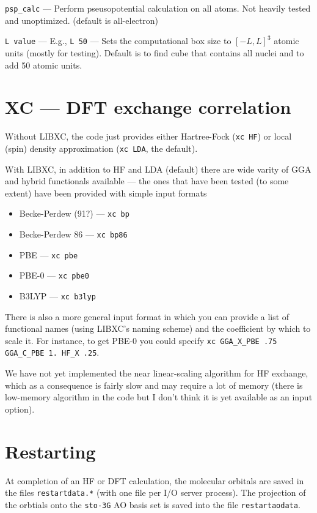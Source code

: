\documentclass[letterpaper]{book}
\begin{document}
{\tt psp\_calc} --- Perform pseusopotential calculation on all atoms.  Not heavily tested and unoptimized. (default is all-electron)

{\tt L value} --- E.g., {\tt L 50} --- Sets the computational box size to $[-L,L]^3$ atomic units (mostly for testing).  Default is to find cube that contains all nuclei and to add 50 atomic units.

\section{XC --- DFT exchange correlation}

Without LIBXC, the code just provides either Hartree-Fock ({\tt xc HF}) or local (spin) density approximation ({\tt xc LDA}, the default).

With LIBXC, in addition to HF and LDA (default) there are wide varity of GGA and hybrid functionals available --- the ones that have been tested (to some extent) have been provided with simple input formats
\begin{itemize}
\item Becke-Perdew (91?) --- \verb+xc bp+
\item Becke-Perdew 86 --- \verb+xc bp86+
\item PBE --- \verb+xc pbe+
\item PBE-0 --- \verb+xc pbe0+
\item B3LYP --- \verb+xc b3lyp+
\end{itemize}

There is also a more general input format in which you can provide a list of functional names (using LIBXC's naming scheme) and the coefficient by which to scale it.  For instance, to get PBE-0 you could specify
\verb+xc GGA_X_PBE .75 GGA_C_PBE 1. HF_X .25+.

We have not yet implemented the near linear-scaling algorithm for HF
exchange, which as a consequence is fairly slow and may require a lot
of memory (there is low-memory algorithm in the code but I don't think
it is yet available as an input option).

\section{Restarting}

At completion of an HF or DFT calculation, the molecular orbitals are
saved in the files \verb+restartdata.*+ (with one file per I/O server
process).  The projection of the orbtials onto the {\tt sto-3G} AO basis
set is saved into the file {\tt restartaodata}.
\end{document}
